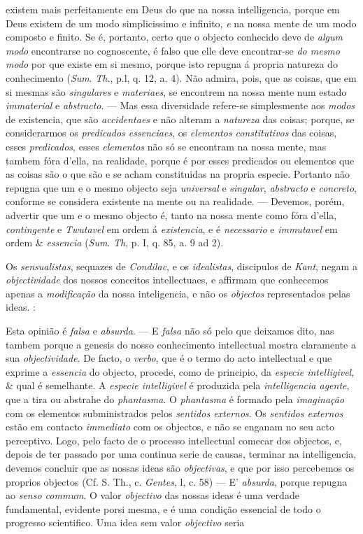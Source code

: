 existem mais perfeitamente em Deus do que na nossa intelligencia, porque em Deus existem de um modo simplicissimo e infinito, \emph{e} na nossa mente de um modo composto e finito. Se é, portanto, certo que o objecto conhecido deve de \emph{algum modo} encontrarse no cognoscente, é falso que elle deve encontrar-se \emph{do mesmo modo} por que existe em si mesmo, porque isto repugna á propria natureza do conhecimento (\emph{Sum}. \emph{Th}., p.l, q. 12, a. 4). Não admira, pois, que as coisas, que em si mesmas são \emph{singulares} e \emph{materiaes}, se encontrem na nossa mente num estado \emph{immaterial} e \emph{abstracto}. --- Mas essa diversidade refere-se simplesmente aos \emph{modos} de existencia, que são \emph{accidentaes} e não alteram a \emph{natureza} das coisas; porque, se considerarmos os \emph{predicados essenciaes}, os \emph{elementos constitutivos} das coisas, esses \emph{predicados}, esses \emph{elementos} não só se encontram na nossa mente, mas tambem fóra d'ella, na realidade, porque é por esses predicados ou elementos que as coisas são o que são e se acham constituidas na propria especie. Portanto não repugna que um e o mesmo objecto seja \emph{universal} e \emph{singular}, \emph{abstracto} e \emph{concreto}, conforme se considera existente na mente ou na realidade. --- Devemos, porém, advertir que um e o mesmo objecto é, tanto na nossa mente como fóra d'ella, \emph{contingente} e \emph{Twutavel} em ordem á \emph{existencia}, e é \emph{necessario} e \emph{immutavel} em ordem \& \emph{essencia} (\emph{Sum}. \emph{Th}, p. I, q. 85, a. 9 ad 2).\par Os \emph{sensualistas}, sequazes de \emph{Condilac}, e os \emph{idealistas}, discipulos de \emph{Kant}, negam a \emph{objectividade} dos nossos conceitos intellectuaes, e affirmam que conhecemos apenas a \emph{modificação} da nossa inteligencia, e não os \emph{objectos} representados pelas ideas. :\par Esta opinião é \emph{falsa} e \emph{absurda}. --- E \emph{falsa} não só pelo que deixamos dito, nas tambem porque a genesis do nosso conhecimento intellectual mostra claramente a sua \emph{objectividade}. De facto, o \emph{verbo}, que é o termo do acto intellectual e que exprime a \emph{essencia} do objecto, procede, como de principio, da \emph{especie intelligivel}, \& qual é semelhante. A \emph{especie intelligivel} é produzida pela \emph{intelligencia agente}, que a tira ou abstrahe do \emph{phantasma}. O \emph{phantasma} é formado pela \emph{imaginação} com os elementos subministrados pelos \emph{sentidos externos}. Os \emph{sentidos externos} estão em contacto \emph{immediato} com os objectos, e não se enganam no seu acto perceptivo. Logo, pelo facto de o processo intellectual comecar dos objectos, e, depois de ter passado por uma continua serie de causas, terminar na intelligencia, devemos concluir que as nossas ideas são \emph{objectivas}, e que por isso percebemos os proprios objectos (Cf. S. Th., c. \emph{Gentes}, l, c. 58) --- E' \emph{absurda}, porque repugna ao \emph{senso commum}. O valor \emph{objectivo} das nossas ideas é uma verdade fundamental, evidente porsi mesma, e é uma condição essencial de todo o progresso scientifico. Uma idea sem valor \emph{objectivo} seria 
